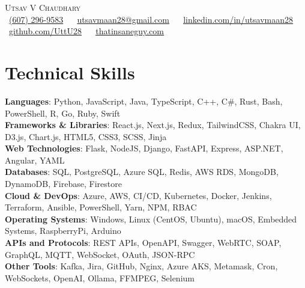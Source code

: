 \documentclass[letterpaper,10pt]{article}
\begin{document}
\begin{center}
    {\huge \scshape Utsav V Chaudhary} \\[2mm]
    \small \raisebox{-0.1\height}
    \faPhone\ \underline{(607) 296-9583} ~ 
    {\faEnvelope\  \underline{\href{mailto:utsavmaan28@gmail.com}{utsavmaan28@gmail.com}}} ~ 
    {\faLinkedin\ \underline{\href{https://www.linkedin.com/in/utsavmaan28}{linkedin.com/in/utsavmaan28}}}  ~
    {\faGithub\ \underline{\href{https://github.com/UttU28}{github.com/UttU28}}} ~
    {\faBriefcase\ \underline{\href{https://thatinsaneguy.com/}{thatinsaneguy.com}}}
    \vspace{-5pt}
\end{center}

\section{Technical Skills}
  \begin{itemize}[leftmargin=0.0in, label={}]
      \small{\item{   
      \textbf{Languages}{: Python, JavaScript, Java, TypeScript, C++, C\#, Rust, Bash, PowerShell, R, Go, Ruby, Swift} \\[1mm]
      \textbf{Frameworks \& Libraries}{: React.js, Next.js, Redux, TailwindCSS, Chakra UI, D3.js, Chart.js, HTML5, CSS3, SCSS, Jinja} \\[1mm]
      \textbf{Web Technologies}{: Flask, NodeJS, Django, FastAPI, Express, ASP.NET, Angular, YAML} \\[1mm]
      \textbf{Databases}{: SQL, PostgreSQL, Azure SQL, Redis, AWS RDS, MongoDB, DynamoDB, Firebase, Firestore} \\[1mm]
      \textbf{Cloud \& DevOps}{: Azure, AWS, CI/CD, Kubernetes, Docker, Jenkins, Terraform, Ansible, PowerShell, Yarn, NPM, RBAC} \\[1mm]
      \textbf{Operating Systems}{: Windows, Linux (CentOS, Ubuntu), macOS, Embedded Systems, RaspberryPi, Arduino} \\[1mm]
      \textbf{APIs and Protocols}{: REST APIs, OpenAPI, Swagger, WebRTC, SOAP, GraphQL, MQTT, WebSocket, OAuth, JSON-RPC} \\[1mm]
      \textbf{Other Tools}{: Kafka, Jira, GitHub, Nginx, Azure AKS, Metamask, Cron, WebSockets, OpenAI, Ollama, FFMPEG, Selenium} \\[1mm]
      }}
  \end{itemize}
\vspace{-13pt}
\end{document}
